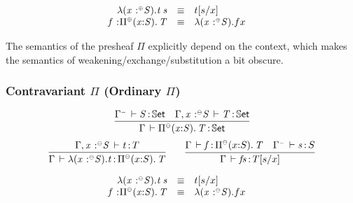 \documentclass[11pt]{article}
\theoremstyle{plain}
\begin{document}
\[
\begin{array}{rcll}
\mathit{\lambda(\mathit{x} \,^{\,}{:}^{{\text{\tiny $\mathord{\oplus}$}}} \mathit{S}).t \: s} & \equiv & t [ s / x ] \\
\mathit{f} \,^{\,}{:}^{} \mathit{\textnormal{$\Pi$}^{{\text{\tiny $\mathord{\oplus}$}}}(x \mathit{:} S).\,\mathit{T}} & \equiv & \lambda(\mathit{x} \,^{\,}{:}^{{\text{\tiny $\mathord{\oplus}$}}} \mathit{S}).fx &
\end{array} \\
\]

The semantics of the presheaf $\Pi$ explicitly depend on the context, which makes the semantics of weakening/exchange/substitution a bit obscure.

\subsubsection{Contravariant $\Pi$ (Ordinary $\Pi$)}
\begin{equation}
	\infer{
		\oftp{\Gamma}{\picon{x}{S}{T}}{\types}
	}{
		\oftp{\Gamma^\con}{S}{\types} &
		\oftp{\Gamma, \tpvar x \conc S}{T}{\types}
	}
\end{equation}
\begin{equation}
	\infer{
		\oftp{\Gamma}{\lacon x S t}{\picon{x}{S}{T}}
	}{
		\oftp{\Gamma, \tpvar x \conc S}{t}{T}
	}
	\qquad
	\infer{
		\oftp{\Gamma}{f s}{T[s/x]}
	}{
		\oftp{\Gamma}{f}{\picon{x}{S}{T}} &
		\oftp{\Gamma^\con}{s}{S}
	}
\end{equation}

\[
\begin{array}{rcll}
\mathit{\lambda(\mathit{x} \,^{\,}{:}^{{\text{\tiny $\mathord{\ominus}$}}} \mathit{S}).t \: s} & \equiv & t [ s / x ] \\
\mathit{f} \,^{\,}{:}^{} \mathit{\textnormal{$\Pi$}^{{\text{\tiny $\mathord{\ominus}$}}}(x \mathit{:} S).\,\mathit{T}} & \equiv & \lambda(\mathit{x} \,^{\,}{:}^{{\text{\tiny $\mathord{\ominus}$}}} \mathit{S}).fx &
\end{array} \\
\]
\end{document}
